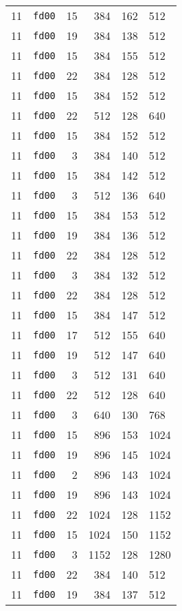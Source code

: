 \documentclass{article}
\begin{document}
\begin{table}[h!]
\begin{tabular}{llrrrl}
    11 & \texttt{fd00} & 15 & 384 & 162 & 512 \\
    11 & \texttt{fd00} & 19 & 384 & 138 & 512 \\
    11 & \texttt{fd00} & 15 & 384 & 155 & 512 \\
    11 & \texttt{fd00} & 22 & 384 & 128 & 512 \\
    11 & \texttt{fd00} & 15 & 384 & 152 & 512 \\
    11 & \texttt{fd00} & 22 & 512 & 128 & 640 \\
    11 & \texttt{fd00} & 15 & 384 & 152 & 512 \\
    11 & \texttt{fd00} & 3 & 384 & 140 & 512 \\
    11 & \texttt{fd00} & 15 & 384 & 142 & 512 \\
    11 & \texttt{fd00} & 3 & 512 & 136 & 640 \\
    11 & \texttt{fd00} & 15 & 384 & 153 & 512 \\
    11 & \texttt{fd00} & 19 & 384 & 136 & 512 \\
    11 & \texttt{fd00} & 22 & 384 & 128 & 512 \\
    11 & \texttt{fd00} & 3 & 384 & 132 & 512 \\
    11 & \texttt{fd00} & 22 & 384 & 128 & 512 \\
    11 & \texttt{fd00} & 15 & 384 & 147 & 512 \\
    11 & \texttt{fd00} & 17 & 512 & 155 & 640 \\
    11 & \texttt{fd00} & 19 & 512 & 147 & 640 \\
    11 & \texttt{fd00} & 3 & 512 & 131 & 640 \\
    11 & \texttt{fd00} & 22 & 512 & 128 & 640 \\
    11 & \texttt{fd00} & 3 & 640 & 130 & 768 \\
    11 & \texttt{fd00} & 15 & 896 & 153 & 1024 \\
    11 & \texttt{fd00} & 19 & 896 & 145 & 1024 \\
    11 & \texttt{fd00} & 2 & 896 & 143 & 1024 \\
    11 & \texttt{fd00} & 19 & 896 & 143 & 1024 \\
    11 & \texttt{fd00} & 22 & 1024 & 128 & 1152 \\
    11 & \texttt{fd00} & 15 & 1024 & 150 & 1152 \\
    11 & \texttt{fd00} & 3 & 1152 & 128 & 1280 \\
    11 & \texttt{fd00} & 22 & 384 & 140 & 512 \\
    11 & \texttt{fd00} & 19 & 384 & 137 & 512 \\

\end{tabular}
\end{table}
\end{document}
